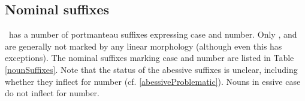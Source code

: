 \subsection{Nominal suffixes}\label{nominalSuffixes}
\PS\ has a number of portmanteau suffixes expressing case and number. 
Only ,  and  are generally %
not marked by any linear morphology (although even this has exceptions). The nominal suffixes marking case and number are listed in Table \vref{nounSuffixes}. Note that the status of the abessive suffixes is unclear, including whether they inflect for number (cf. \SEC\ref{abessiveProblematic}). Nouns in essive case do not inflect for number.


